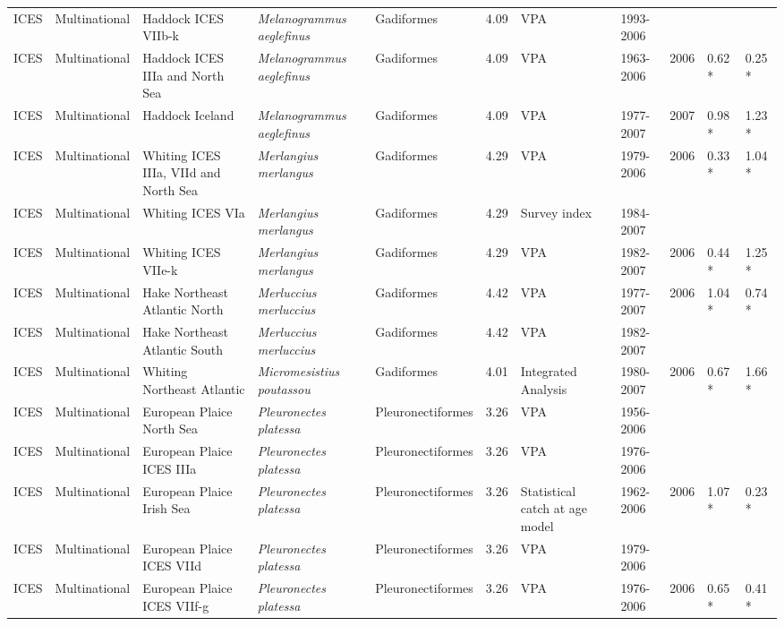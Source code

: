\begin{longtable}{p{1.5cm}p{1.5cm}p{3cm}p{3cm}p{2.5cm}p{0.9cm}p{1.4cm}p{0.9cm}p{0.9cm}p{0.9cm}p{1cm}}
  ICES & Multinational & Haddock ICES VIIb-k & \textit{Melanogrammus aeglefinus} & Gadiformes & 4.09 & VPA & 1993-2006 &  &  &  \\ 
  ICES & Multinational & Haddock ICES IIIa and North Sea & \textit{Melanogrammus aeglefinus} & Gadiformes & 4.09 & VPA & 1963-2006 & 2006 & 0.62 * & 0.25 * \\ 
  ICES & Multinational & Haddock Iceland & \textit{Melanogrammus aeglefinus} & Gadiformes & 4.09 & VPA & 1977-2007 & 2007 & 0.98 * & 1.23 * \\ 
  ICES & Multinational & Whiting ICES IIIa, VIId and North Sea & \textit{Merlangius merlangus} & Gadiformes & 4.29 & VPA & 1979-2006 & 2006 & 0.33 * & 1.04 * \\ 
  ICES & Multinational & Whiting ICES VIa & \textit{Merlangius merlangus} & Gadiformes & 4.29 & Survey index & 1984-2007 &  &  &  \\ 
  ICES & Multinational & Whiting ICES VIIe-k & \textit{Merlangius merlangus} & Gadiformes & 4.29 & VPA & 1982-2007 & 2006 & 0.44 * & 1.25 * \\ 
  ICES & Multinational & Hake Northeast Atlantic North & \textit{Merluccius merluccius} & Gadiformes & 4.42 & VPA & 1977-2007 & 2006 & 1.04 * & 0.74 * \\ 
  ICES & Multinational & Hake Northeast Atlantic South & \textit{Merluccius merluccius} & Gadiformes & 4.42 & VPA & 1982-2007 &  &  &  \\ 
  ICES & Multinational & Whiting Northeast Atlantic & \textit{Micromesistius poutassou} & Gadiformes & 4.01 & Integrated Analysis & 1980-2007 & 2006 & 0.67 * & 1.66 * \\ 
  ICES & Multinational & European Plaice North Sea & \textit{Pleuronectes platessa} & Pleuronectiformes & 3.26 & VPA & 1956-2006 &  &  &  \\ 
  ICES & Multinational & European Plaice ICES IIIa & \textit{Pleuronectes platessa} & Pleuronectiformes & 3.26 & VPA & 1976-2006 &  &  &  \\ 
  ICES & Multinational & European Plaice Irish Sea & \textit{Pleuronectes platessa} & Pleuronectiformes & 3.26 & Statistical catch at age model & 1962-2006 & 2006 & 1.07 * & 0.23 * \\ 
  ICES & Multinational & European Plaice ICES VIId & \textit{Pleuronectes platessa} & Pleuronectiformes & 3.26 & VPA & 1979-2006 &  &  &  \\ 
  ICES & Multinational & European Plaice ICES VIIf-g & \textit{Pleuronectes platessa} & Pleuronectiformes & 3.26 & VPA & 1976-2006 & 2006 & 0.65 * & 0.41 * \\ 

\end{longtable}
